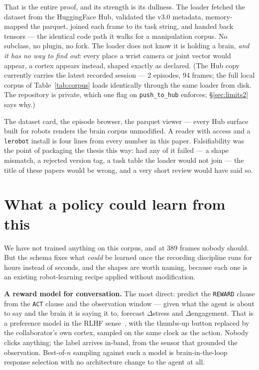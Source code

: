 \documentclass{article}
\begin{document}
That is the entire proof, and its strength is its dullness. The loader fetched the dataset from the HuggingFace Hub, validated the v3.0 metadata, memory-mapped the parquet, joined each frame to its task string, and handed back tensors --- the identical code path it walks for a manipulation corpus. No subclass, no plugin, no fork. The loader does not know it is holding a brain, \emph{and it has no way to find out}: every place a wrist camera or joint vector would appear, a cortex appears instead, shaped exactly as declared. (The Hub copy currently carries the latest recorded session --- 2 episodes, 94 frames; the full local corpus of Table~\ref{tab:corpus} loads identically through the same loader from disk. The repository is private, which one flag on \texttt{push\_to\_hub} enforces; \S\ref{sec:limits2} says why.)

The dataset card, the episode browser, the parquet viewer --- every Hub surface built for robots renders the brain corpus unmodified. A reader with access and a \texttt{lerobot} install is four lines from every number in this paper. Falsifiability was the point of packaging the thesis this way: had any of it failed --- a shape mismatch, a rejected version tag, a task table the loader would not join --- the title of these papers would be wrong, and a very short review would have said so.

\section{What a policy could learn from this}
\label{sec:learn}

We have not trained anything on this corpus, and at 389 frames nobody should. But the schema fixes what \emph{could} be learned once the recording discipline runs for hours instead of seconds, and the shapes are worth naming, because each one is an existing robot-learning recipe applied without modification.

\textbf{A reward model for conversation.} The most direct: predict the \texttt{REWARD} clause from the \texttt{ACT} clause and the observation window --- given what the agent is about to say and the brain it is saying it to, forecast $\Delta$stress and $\Delta$engagement. That is a preference model in the RLHF sense~\cite{christiano2017rlhf}, with the thumbs-up button replaced by the collaborator's own cortex, sampled on the same clock as the action. Nobody clicks anything; the label arrives in-band, from the sensor that grounded the observation. Best-of-$n$ sampling against such a model is brain-in-the-loop response selection with no architecture change to the agent at all.
\end{document}
